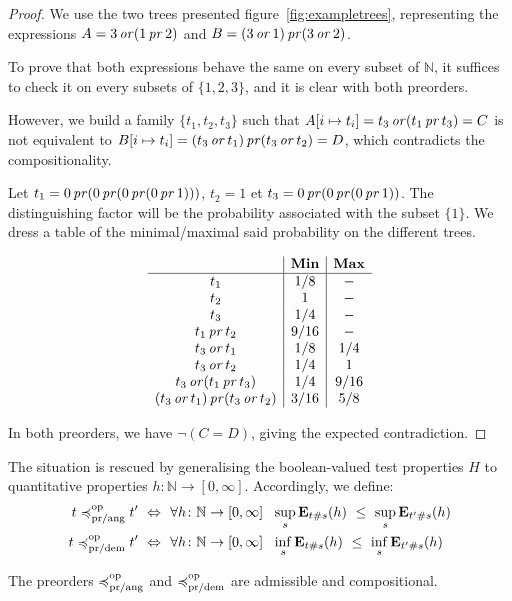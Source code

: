 \begin{proof}
    We use the two trees presented figure~\ref{fig:exampletrees},
    representing the expressions $A = 3 \operatorname{\mathit{or}} (1 \operatorname{\mathit{pr}} 2)$
    and $B = (3 \operatorname{\mathit{or}} 1) \operatorname{\mathit{pr}} (3 \operatorname{\mathit{or}} 2)$.

    To prove that both expressions behave the same on every subset of $\mathbb{N}$,
    it suffices to check it on every subsets of $\{ 1, 2, 3\}$, and it is clear
    with both preorders.

    However, we build a family $\{ t_1, t_2, t_3\}$ such that 
    $A[ i \mapsto t_i] = t_3 \operatorname{\mathit{or}} (t_1 \operatorname{\mathit{pr}} t_3) = C$ is not equivalent to 
    $B[ i\mapsto t_i] = (t_3 \operatorname{\mathit{or}} t_1) \operatorname{\mathit{pr}} (t_3 \operatorname{\mathit{or}} t_2) = D$,
    which contradicts the compositionality.

    Let $t_1 = 0 \operatorname{\mathit{pr}} (0 \operatorname{\mathit{pr}} (0 \operatorname{\mathit{pr}} (0 \operatorname{\mathit{pr}} 1)))$,
    $t_2 = 1$ et $t_3 = 0 \operatorname{\mathit{pr}} (0 \operatorname{\mathit{pr}} (0 \operatorname{\mathit{pr}} 1))$. The distinguishing 
    factor will be the probability associated with the subset $\{ 1 \}$.
    We dress a table of the minimal/maximal said probability on the different 
    trees.
    
    \begin{equation*}
        \begin{array}{c|c|c}
                & \textbf{Min} & \textbf{Max} \\ \hline
            t_1 & 1/8 & - \\
            t_2 & 1   & -   \\
            t_3 & 1/4 & - \\
            t_1 \operatorname{\mathit{pr}} t_2 & 9 / 16 & - \\
            t_3 \operatorname{\mathit{or}} t_1 & 1/8    & 1/4 \\
            t_3 \operatorname{\mathit{or}} t_2 & 1/4    & 1   \\
            t_3 \operatorname{\mathit{or}} (t_1 \operatorname{\mathit{pr}} t_3) & 1/4 & 9/16 \\
            (t_3 \operatorname{\mathit{or}} t_1) \operatorname{\mathit{pr}} (t_3 \operatorname{\mathit{or}} t_2) & 3 / 16 & 5/8 \\
        \end{array}
    \end{equation*}

    In both preorders, we have $\neg (C = D)$,
    giving the expected contradiction.
\end{proof}

The situation is rescued by generalising the boolean-valued test properties $H$ to 
quantitative properties $h \colon \mathbb{N} \to [0,\infty]$. 
Accordingly, we define:
\begin{align*}
t \preccurlyeq^{\text{op}}_{\text{pr/ang}} t' ~ \Leftrightarrow ~ ~& \forall h \colon \mathbb{N} \to [0,\infty]~~ \sup_s  \mathbf{E}_{t\#s} (h)~ \leq~ \sup_s \mathbf{E}_{t'\#s} (h)
\\
t \preccurlyeq^{\text{op}}_{\text{pr/dem}} t' ~ \Leftrightarrow ~ ~& \forall h \colon \mathbb{N} \to [0,\infty]~~ \inf_s  \mathbf{E}_{t\#s} (h)~ \leq~ \inf_s \mathbf{E}_{t'\#s} (h)
\end{align*}
\begin{proposition}
The preorders $\preccurlyeq^{\text{op}}_{\text{pr/ang}}$ and $\preccurlyeq^{\text{op}}_{\text{pr/dem}}$ are admissible and compositional.
\end{proposition}


